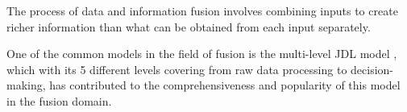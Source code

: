 \documentclass[5p,times]{elsarticle}
\begin{document}



The process of data and information fusion involves combining inputs to create richer information than what can be obtained from
 each input separately. 





One of the common models in the field of fusion is the multi-level JDL model \cite{Hall1997},
 which with its 5 different levels covering from raw data processing to decision-making, has contributed to the comprehensiveness and popularity of this model in the fusion domain.
\end{document}
